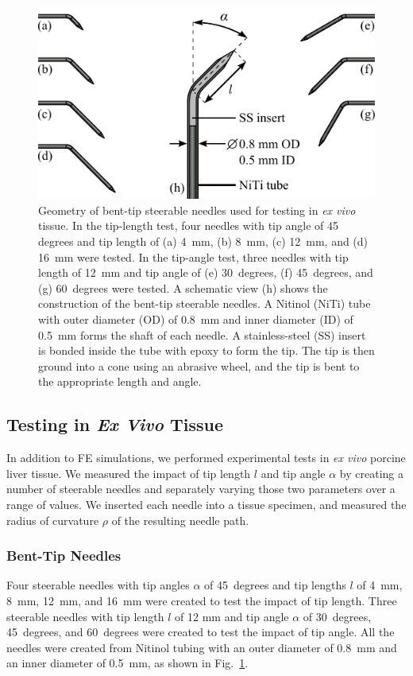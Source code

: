 \begin{figure}[!t]
\centering
\includegraphics[width=0.65\columnwidth]{Images/Chapter3/Bent-TipGeometry/Bent-TipGeometry}%
\caption[Geometry of bent-tip steerable needles used for testing]{Geometry of bent-tip steerable needles used for testing in \textit{ex vivo} tissue. In the tip-length test, four needles with tip angle of 45 degrees and tip length of (a) 4~mm, (b) 8~mm, (c) 12~mm, and (d) 16~mm were tested. In the tip-angle test, three needles with tip length of 12~mm and tip angle of (e) 30~degrees, (f) 45~degrees, and (g) 60~degrees were tested. A schematic view (h) shows the construction of the bent-tip steerable needles. A Nitinol (NiTi) tube with outer diameter (OD) of 0.8~mm and inner diameter (ID) of 0.5~mm forms the shaft of each needle. A stainless-steel (SS) insert is bonded inside the tube with epoxy to form the tip. The tip is then ground into a cone using an abrasive wheel, and the tip is bent to the appropriate length and angle.}
\label{fig:Bent-TipGeometry}
\end{figure}

\subsection{Testing in \textit{Ex Vivo} Tissue}
In addition to FE simulations, we performed experimental tests in \textit{ex vivo} porcine liver tissue. We measured the impact of tip length $l$ and tip angle $\alpha$ by creating a number of steerable needles and separately varying those two parameters over a range of values. We inserted each needle into a tissue specimen, and measured the radius of curvature $\rho$ of the resulting needle path.

\subsubsection{Bent-Tip Needles}
Four steerable needles with tip angles $\alpha$ of 45~degrees and tip lengths $l$ of 4~mm, 8~mm, 12~mm, and 16~mm were created to test the impact of tip length. Three steerable needles with tip length $l$ of 12 mm and tip angle $\alpha$ of 30~degrees, 45~degrees, and 60~degrees were created to test the impact of tip angle. All the needles were created from Nitinol tubing with an outer diameter of 0.8~mm and an inner diameter of 0.5~mm, as shown in Fig.~\ref{fig:Bent-TipGeometry}.


